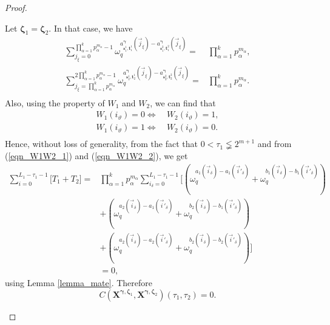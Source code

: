 \documentclass[pdflatex,sn-mathphys-num]{sn-jnl}%
\theoremstyle{thmstyleone}
\begin{document}
\begin{proof}
\begin{mycases}
			\begin{mysubcases}
				\item Let $\bm{\zeta}_1 = \bm{\zeta}_2$. In that case, we have
				\begin{equation}
					\begin{split}
						\sum_{j_{\xi}=0}^{\prod_{\alpha=1}^{k} p_\alpha^{m_\alpha} -1} \omega_q^{a_{\mathbf{s}_1^1,\mathbf{t}_1^1}^{\bm{\gamma}} (\vec{j}_{\xi})-a_{\mathbf{s}_1^2,\mathbf{t}_1^2}^{\bm{\gamma}} (\vec{j}_{\xi}) }=& \prod_{\alpha=1}^{k} p_\alpha^{m_\alpha},\\
						\sum_{j_{\xi}= \prod_{\alpha=1}^{k} p_\alpha^{m_\alpha}}^{2 \prod_{\alpha=1}^{k} p_\alpha^{m_\alpha} -1} \omega_q^{a_{\mathbf{s}_2^1,\mathbf{t}_2^1}^{\bm{\gamma}} (\vec{j}_{\xi})-a_{\mathbf{s}_2^2,\mathbf{t}_2^2}^{\bm{\gamma}} (\vec{j}_{\xi}) }=& \prod_{\alpha=1}^{k} p_\alpha^{m_\alpha}.\\
					\end{split}
				\end{equation}
				Also, using the property of $W_1$ and $W_2$, we can find that
				\begin{equation}
					\begin{split}
						W_1(i_\vartheta)=0  \Leftrightarrow  &~ W_2(i_\vartheta)=1,\\
						W_1(i_\vartheta)=1 \Leftrightarrow  &~ W_2(i_\vartheta)=0.\\
					\end{split}
				\end{equation}
				Hence, without loss of generality, from the fact that $0< \tau_1 \lneqq 2^{m+1}$ and from (\ref{eqn_W1W2_1}) and (\ref{eqn_W1W2_2}), we get
				\begin{equation}
					\begin{split}
						\sum_{i=0}^{L_1 -\tau_1-1} \bigg[ T_1 + T_2 \bigg]
						=&\prod_{\alpha=1}^{k} p_\alpha^{m_\alpha} \sum_{i_{\delta}=0}^{L_1 -\tau_1-1} \bigg[ \left( \omega_q^{ a_1 (\vec{i}_{\delta})- a_1 (\vec{i}'_{\delta})} + \omega_q^{ b_1 (\vec{i}_{\delta})- b_1 (\vec{i}'_{\delta})}  \right)\\
						& + \left( \omega_q^{ a_2 (\vec{i}_{\delta})- a_1 (\vec{i}'_{\delta})} + \omega_q^{ b_2 (\vec{i}_{\delta})- b_1 (\vec{i}'_{\delta})}  \right)\\ &+\left( \omega_q^{ a_2 (\vec{i}_{\delta})- a_2 (\vec{i}'_{\delta})} + \omega_q^{ b_2 (\vec{i}_{\delta})- b_2 (\vec{i}'_{\delta})}  \right)   \bigg]\\
						&=0,
					\end{split}
				\end{equation}
				using Lemma \ref{lemma_mate}. Therefore
				\begin{equation}
					C\left( \mathbf{X}^{\bm{\gamma},\bm{\zeta}_1}, \mathbf{X}^{\bm{\gamma}, \bm{\zeta}_2} \right) (\tau_1, \tau_2)=0.
				\end{equation}
				

\end{mysubcases}
\end{mycases}
\end{proof}
\end{document}

